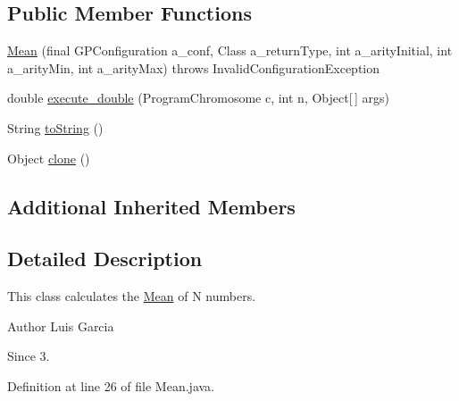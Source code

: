 \subsection*{Public Member Functions}
\begin{DoxyCompactItemize}
\item 
\hyperlink{classorg_1_1jgap_1_1gp_1_1function_1_1_mean_afd7f238feeb6951c9ca3bc61ea0015fb}{Mean} (final G\-P\-Configuration a\-\_\-conf, Class a\-\_\-return\-Type, int a\-\_\-arity\-Initial, int a\-\_\-arity\-Min, int a\-\_\-arity\-Max)  throws Invalid\-Configuration\-Exception 
\item 
double \hyperlink{classorg_1_1jgap_1_1gp_1_1function_1_1_mean_a42e148800dd83c49d77046a0cfe3d913}{execute\-\_\-double} (Program\-Chromosome c, int n, Object\mbox{[}$\,$\mbox{]} args)
\item 
String \hyperlink{classorg_1_1jgap_1_1gp_1_1function_1_1_mean_a77e51439c41cf81799ef2c33fe4c8658}{to\-String} ()
\item 
Object \hyperlink{classorg_1_1jgap_1_1gp_1_1function_1_1_mean_a51d6f7f0a034136a1740764f9350e359}{clone} ()
\end{DoxyCompactItemize}
\subsection*{Additional Inherited Members}


\subsection{Detailed Description}
This class calculates the \hyperlink{classorg_1_1jgap_1_1gp_1_1function_1_1_mean}{Mean} of N numbers.

\begin{DoxyAuthor}{Author}
Luis Garcia
\end{DoxyAuthor}
\begin{DoxySince}{Since}
3. 
\end{DoxySince}


Definition at line 26 of file Mean.\-java.



